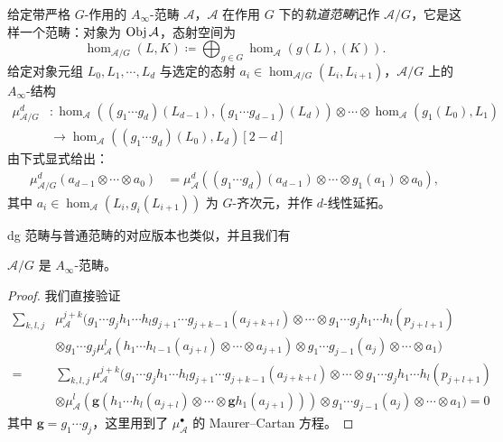 \begin{dfn}\label{defn:Ainf-orbit-category}
    给定带严格 $G$-作用的 $A_{\infty}$-范畴 $\mathcal{A}$，$\mathcal{A}$ 在作用 $G$ 下的\emph{轨道范畴}记作 $\mathcal{A}/G$，它是这样一个范畴：对象为 $\operatorname{Obj}\mathcal{A}$，态射空间为\[
    \hom_{\mathcal{A}/G} (L,K)\coloneqq\bigoplus_{g\in G}\hom_{\mathcal{A}} (g(L),(K)).
    \]
    给定对象元组 $L_0, L_1,\dotsb ,L_d$ 与选定的态射 $a_i\in\hom_{\mathcal{A}/G} (L_i, L_{i+1})$，$\mathcal{A}/G$ 上的 $A_{\infty}$-结构 \begin{align*}
    \mu_{\mathcal{A}/G}^d &\colon\hom_{\mathcal{A}} ((g_1\dotsb g_d)(L_{d-1}),(g_1\dotsb g_{d-1})(L_d))\otimes\dotsb\otimes\hom_{\mathcal{A}} (g_1 (L_0),L_1)\\
    &\to\hom_{\mathcal{A}} ((g_1\dotsb g_d)(L_0),L_d)[2-d]
    \end{align*}
    由下式显式给出：
    \begin{align*}
        \mu_{\mathcal{A}/G}^d (a_{d-1}\otimes\dotsb\otimes a_0)&=\mu_{\mathcal{A}}^d ((g_1\dotsb g_d) (a_{d-1})\otimes\dotsb\otimes g_1 (a_1)\otimes a_0),
    \end{align*}
    其中 $a_i\in\hom_{\mathcal{A}} (L_i,g_i (L_{i+1}))$ 为 $G$-齐次元，并作 $d$-线性延拓。
\end{dfn}
dg 范畴与普通范畴的对应版本也类似，并且我们有
\begin{lmm}
    $\mathcal{A}/G$ 是 $A_{\infty}$-范畴。
\end{lmm}
\begin{proof}
    我们直接验证
\begin{align*}
        \sum_{k,l,j}&\mu^{j+k}_{\mathcal{A}}(g_1\dotsb g_j h_1\dotsb h_l g_{j+1}\dotsb g_{j+k-1} (a_{j+k+l})\otimes\dotsb\otimes g_1\dotsb g_j h_1\dotsb h_l (p_{j+l+1})\\
        &\otimes g_1\dotsb g_j\mu^l_{\mathcal{A}}(h_1\dotsb h_{l-1} (a_{j+l})\otimes\dotsb\otimes a_{j+1})\otimes g_1\dotsb g_{j-1} (a_j)\otimes\dotsb\otimes a_1)\\
        =&\sum_{k,l,j}\mu_{\mathcal{A}}^{j+k}(g_1\dotsb g_j h_1\dotsb h_l g_{j+1}\dotsb g_{j+k-1} (a_{j+k+l})\otimes\dotsb\otimes g_1\dotsb g_j h_1\dotsb h_l (p_{j+l+1})\\
        &\otimes\mu^l_{\mathcal{A}}\left(\mathbf{g}(h_1\dotsb h_l(a_{j+l})\otimes\dotsb\otimes\mathbf{g} h_1 (a_{j+1}))\right)\otimes g_1\dotsb g_{j-1} (a_j)\otimes\dotsb\otimes a_1)=0
\end{align*}
    其中 $\mathbf{g}=g_1\dotsb g_j$，这里用到了 $\mu_{\mathcal{A}}^{\bullet}$ 的 Maurer--Cartan 方程。
\end{proof}

